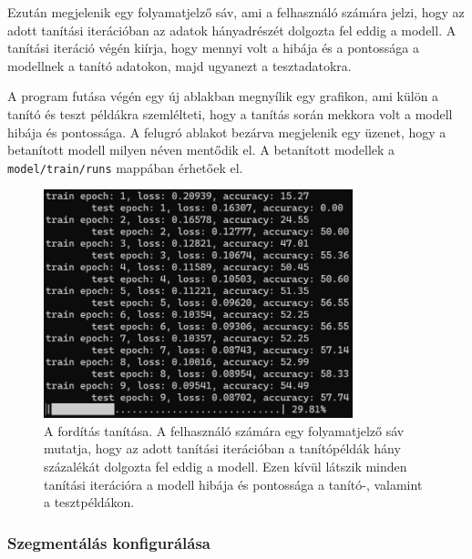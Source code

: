 Ezután megjelenik egy folyamatjelző sáv, ami a felhasználó számára
jelzi, hogy az adott tanítási iterációban az adatok hányadrészét dolgozta fel eddig
a modell. A tanítási iteráció végén kiírja, hogy mennyi volt a hibája és a pontossága
a modellnek a tanító adatokon, majd ugyanezt a tesztadatokra.

A program futása végén egy új ablakban megnyílik egy grafikon, ami külön
a tanító és teszt példákra szemlélteti, hogy a tanítás során mekkora volt
a modell hibája és pontossága. A felugró ablakot bezárva megjelenik egy üzenet,
hogy a betanított modell milyen néven mentődik el. A betanított
modellek a \texttt{model/train/runs} mappában érhetőek el. 

\begin{figure}[H]
	\centering
	\includegraphics[width=0.8\textwidth]{images/translation_train.png}
	\caption[A fordítás tanítása]{A fordítás tanítása. A felhasználó számára egy folyamatjelző sáv
        mutatja, hogy az adott tanítási iterációban a tanítópéldák hány százalékát dolgozta fel
        eddig a modell. Ezen kívül látszik minden tanítási iterációra a modell hibája és pontossága
        a tanító-, valamint a tesztpéldákon.}
	\label{fig:train}
\end{figure}

\subsubsection{Szegmentálás konfigurálása}

